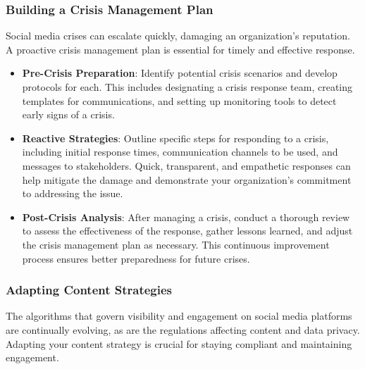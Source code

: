 \documentclass[
]{book}
\providecommand{\tightlist}{%
  \setlength{\itemsep}{0pt}\setlength{\parskip}{0pt}}
\begin{document}
\hypertarget{building-a-crisis-management-plan}{%
\subsubsection*{Building a Crisis Management Plan}\label{building-a-crisis-management-plan}}

Social media crises can escalate quickly, damaging an organization's reputation. A proactive crisis management plan is essential for timely and effective response.

\begin{itemize}
\tightlist
\item
  \textbf{Pre-Crisis Preparation}: Identify potential crisis scenarios and develop protocols for each. This includes designating a crisis response team, creating templates for communications, and setting up monitoring tools to detect early signs of a crisis.
\item
  \textbf{Reactive Strategies}: Outline specific steps for responding to a crisis, including initial response times, communication channels to be used, and messages to stakeholders. Quick, transparent, and empathetic responses can help mitigate the damage and demonstrate your organization's commitment to addressing the issue.
\item
  \textbf{Post-Crisis Analysis}: After managing a crisis, conduct a thorough review to assess the effectiveness of the response, gather lessons learned, and adjust the crisis management plan as necessary. This continuous improvement process ensures better preparedness for future crises.
\end{itemize}

\hypertarget{adapting-content-strategies}{%
\subsubsection*{Adapting Content Strategies}\label{adapting-content-strategies}}

The algorithms that govern visibility and engagement on social media platforms are continually evolving, as are the regulations affecting content and data privacy. Adapting your content strategy is crucial for staying compliant and maintaining engagement.
\end{document}
